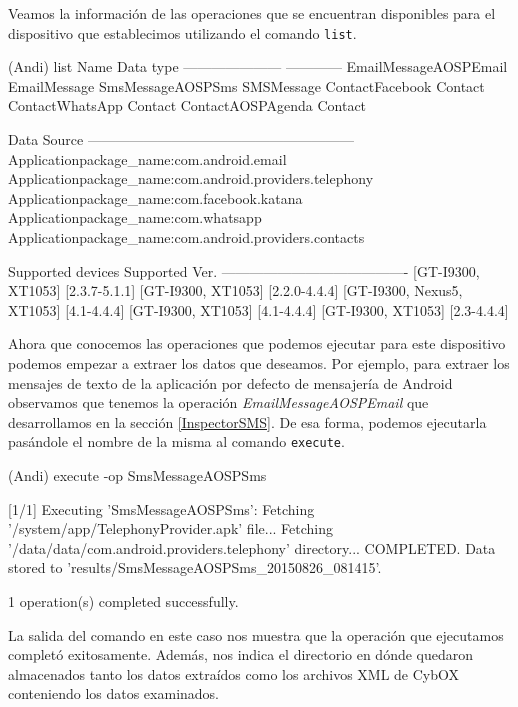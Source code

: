Veamos la información de las operaciones que se encuentran disponibles para el dispositivo que establecimos utilizando el comando \texttt{list}.
\newline

\begin{bash}
(Andi) list
Name                   Data type     
---------------------  ------------  
EmailMessageAOSPEmail  EmailMessage  
SmsMessageAOSPSms      SMSMessage    
ContactFacebook        Contact       
ContactWhatsApp        Contact       
ContactAOSPAgenda      Contact       

Data Source                                                
---------------------------------------------------------  
Application{package_name:com.android.email}                
Application{package_name:com.android.providers.telephony}  
Application{package_name:com.facebook.katana}              
Application{package_name:com.whatsapp}                     
Application{package_name:com.android.providers.contacts}   

Supported devices           Supported Ver.
----------------------------------------  
[GT-I9300, XT1053]          [2.3.7-5.1.1]
[GT-I9300, XT1053]          [2.2.0-4.4.4]
[GT-I9300, Nexus5, XT1053]  [4.1-4.4.4]
[GT-I9300, XT1053]          [4.1-4.4.4]
[GT-I9300, XT1053]          [2.3-4.4.4]
\end{bash}

Ahora que conocemos las operaciones que podemos ejecutar para este dispositivo podemos empezar a extraer los datos que deseamos. Por ejemplo, para extraer los mensajes de texto de la aplicación por defecto de mensajería de Android observamos que tenemos la operación \emph{EmailMessageAOSPEmail} que desarrollamos en la sección \ref{InspectorSMS}. De esa forma, podemos ejecutarla pasándole el nombre de la misma al comando \texttt{execute}.
\newline

\begin{bash}
(Andi) execute -op SmsMessageAOSPSms 

[1/1] Executing 'SmsMessageAOSPSms': 
Fetching '/system/app/TelephonyProvider.apk' file...
Fetching '/data/data/com.android.providers.telephony' directory...
COMPLETED. Data stored to 'results/SmsMessageAOSPSms_20150826_081415'.

1 operation(s) completed successfully.
\end{bash}

La salida del comando en este caso nos muestra que la operación que ejecutamos completó exitosamente. Además, nos indica el directorio en dónde quedaron almacenados tanto los datos extraídos como los archivos XML de CybOX conteniendo los datos examinados.

